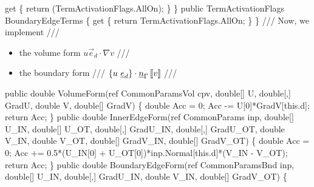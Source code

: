 {\btab \btab get \{ return (TermActivationFlags.AllOn); \} \newline 
\btab \} \newline 
 \newline 
\btab public TermActivationFlags BoundaryEdgeTerms \{ \newline 
\btab    get \{ return TermActivationFlags.AllOn; \} \newline 
\btab \} \newline 
 \newline 
    /// Now, we implement 
    /// \begin{itemize}
    ///    \item the volume form $u \vec{e}_d \cdot \nabla v$
    ///    \item the boundary form 
    ///       $\mean{u \ \vec{e}_d} \cdot \vec{n}_\Gamma \jump{v}$
    /// \end{itemize}
\btab public double VolumeForm(ref CommonParamsVol cpv,  \newline 
\btab \btab    double[] U, double[,] GradU,  \newline 
\btab \btab    double V, double[] GradV) \{ \newline 
 \newline 
\btab \btab double Acc = 0; \newline 
\btab \btab Acc -= U[0]*GradV[this.d]; \newline 
\btab \btab return Acc; \newline 
\btab \}         \newline 
 \newline 
\btab public double InnerEdgeForm(ref CommonParams inp,  \newline 
\btab \btab double[] U\_IN, double[] U\_OT, double[,] GradU\_IN, double[,] GradU\_OT,  \newline 
\btab \btab double V\_IN, double V\_OT, double[] GradV\_IN, double[] GradV\_OT) \{ \newline 
 \newline 
\btab \btab double Acc = 0; \newline 
\btab \btab Acc += 0.5*(U\_IN[0] + U\_OT[0])*inp.Normal[this.d]*(V\_IN - V\_OT); \newline 
\btab \btab return Acc;   \newline 
\btab  \} \newline 
 \newline 
\btab public double BoundaryEdgeForm(ref CommonParamsBnd inp,  \newline 
\btab \btab double[] U\_IN, double[,] GradU\_IN, double V\_IN, double[] GradV\_OT) \{ \newline 
}
